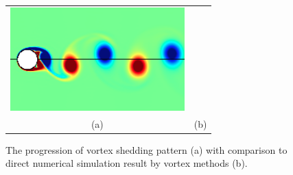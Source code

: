 \begin{figure}
\begin{center}
\begin{tabular}{cc}
 \includegraphics[height=4cm]{./Figures/results/rotating/T_26.png}  \\
 (a) & (b) \\
 \end{tabular}
\end{center}
 \caption[Vortex shedding pattern around a sinusoidally rotating cylinder]{The progression of vortex shedding pattern (a) with comparison to direct numerical simulation result by vortex methods (b). }
 \label{fig:RotatingWake2}
\end{figure}

